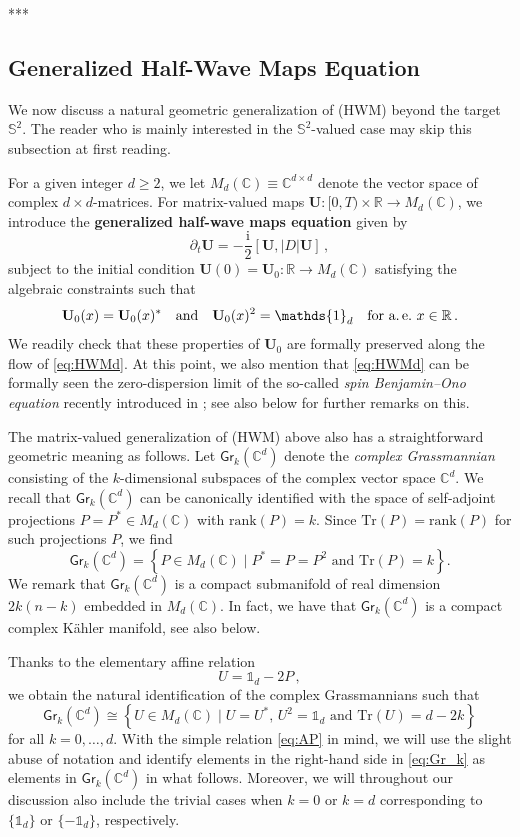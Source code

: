 \documentclass[11pt,reqno]{amsart}
\theoremstyle{definition}
\theoremstyle{remark}
\theoremstyle{remark}
\numberwithin{equation}{section}
\newcommand{\C}{\mathbb{C}}
\newcommand{\R}{\mathbb{R}}
\newcommand{\Ss}{\mathbb{S}}
\newcommand{\pt}{\partial}
\newcommand{\be}{\begin{equation}}
\newcommand{\ee}{\end{equation}}
\newcommand{\ii}{\mathrm{i}}
\newcommand{\Ub}{\mathbf{U}}
\newcommand{\Tr}{\mathrm{Tr}}
\newcommand{\Gr}{\mathsf{Gr}}
\begin{document}
\bigskip
\begin{center}
***
\end{center}
\medskip

\subsection*{Generalized Half-Wave Maps Equation}
We now discuss a natural geometric generalization of (HWM) beyond the target $\Ss^2$. The reader who is mainly interested in the $\Ss^2$-valued case may skip this subsection at first reading.
 
 For a given integer $d \geq 2$, we let $M_d(\C) \equiv \C^{d \times d}$ denote the vector space of complex $d \times d$-matrices. For matrix-valued maps $\Ub : [0,T) \times \R \to M_d(\C)$, we introduce the \textbf{generalized half-wave maps equation} given by
\be \label{eq:HWMd} \tag{HWM$_d$}
\pt_t \Ub = -\frac{\ii}{2} [\Ub, |D| \Ub] \, ,
\ee
subject to the initial condition $\Ub(0) = \Ub_0 : \R \to M_d(\C)$ satisfying the algebraic constraints such that
\be \label{eq:consU}
\Ub_0(x) = \Ub_0(x)^* \quad \mbox{and} \quad \Ub_0(x)^2 = \mathds{1}_d \quad \mbox{for a.\,e.~$x \in \R$} \, .
\ee 
We readily check that these properties of $\Ub_0$ are formally preserved along the flow of \eqref{eq:HWMd}. At this point, we also mention that \eqref{eq:HWMd} can be formally seen the zero-dispersion limit of the so-called {\em spin Benjamin--Ono equation} recently introduced in \cite{BeLaLe-22}; see also below for further remarks on this. 

The matrix-valued generalization of (HWM) above also has a straightforward geometric meaning as follows. Let $\Gr_k(\C^d)$ denote the {\em complex Grassmannian} consisting of the $k$-dimensional subspaces of the complex vector space $\C^d$. We recall that $\Gr_k(\C^d)$ can be canonically identified with the space of self-adjoint projections $P =P^* \in M_d(\C)$ with $\mathrm{rank}(P)=k$. Since $\mathrm{Tr}(P)=\mathrm{rank}(P)$ for such projections $P$, we find
\be
\Gr_k(\C^d) = \left \{ P \in M_d(\C) \mid \mbox{$P^*=P = P^2$ and $\Tr(P)=k$} \right \}.
\ee
We remark that $\Gr_k(\C^d)$ is a compact submanifold of real dimension $2k(n-k)$ embedded in $M_d(\C)$. In fact, we have that $\Gr_k(\C^d)$ is a compact complex K\"ahler manifold, see also below.

Thanks to the elementary affine relation 
\be \label{eq:AP}
U= \mathds{1}_d - 2 P \, ,
\ee
 we obtain the natural identification of the complex Grassmannians such that
\be \label{eq:Gr_k}
\Gr_k(\C^d) \cong \left \{ U \in M_d(\C) \mid \mbox{$U=U^*, \, U^2 = \mathds{1}_d$ and $\Tr(U) = d- 2k$} \right \}
\ee
for all $k=0, \ldots, d$.  With the simple relation \eqref{eq:AP} in mind, we will use the slight abuse of notation and identify elements in the right-hand side in \eqref{eq:Gr_k} as elements in $\Gr_k(\C^d)$ in what follows.  Moreover, we will throughout our discussion also include the trivial cases when $k=0$ or $k= d$ corresponding to $\{ \mathds{1}_d \}$ or $\{-\mathds{1}_d \}$, respectively. 
\end{document}

